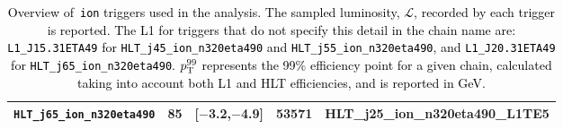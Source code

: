 \begin{table}[!ht]
\begin{tabular}{ | c | c | c | c | c |}
        \multicolumn{1}{|l|}{\texttt{HLT\_j65\_ion\_n320eta490}}                 & 85  & [$-$3.2,$-$4.9]   & 53571 &  \multicolumn{1}{l|}{\tiny HLT\_j25\_ion\_n320eta490\_L1TE5}\\
        \hline
    \end{tabular}
    \vspace{2mm}
    \caption{
        \textcolor{black}{
            Overview of \pxPb\,\texttt{ion} triggers used in the analysis. The sampled luminosity, $\mathscr{L}$, recorded by each trigger is reported. The L1 for triggers that do not specify this detail in the chain name are:  \texttt{L1\_J15.31ETA49} for \texttt{HLT\_j45\_ion\_n320eta490} and \texttt{HLT\_j55\_ion\_n320eta490}, and \texttt{L1\_J20.31ETA49} for \texttt{HLT\_j65\_ion\_n320eta490}. $p_{\text{T}}^{99}$ represents the 99\% efficiency point for a given chain, calculated taking into account both L1 and HLT efficiencies, and is reported in GeV.
        }
    }
    \label{tab:trigger_details_pPb}
\end{table}
